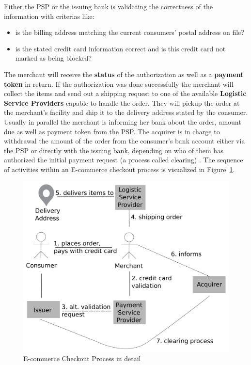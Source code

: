 Either the \gls{PSP} or the issuing bank is validating the correctness of the information with criterias like: \@

\begin{itemize}
    \item is the billing address matching the current consumers' postal address on file?
    \item is the stated credit card information correct and is this credit card not marked as being blocked?
\end{itemize}

The merchant will receive the \textbf{status} of the authorization as well as a \textbf{payment token} in return. If the authorization was done successfully the merchant will collect the items and send out a shipping request to one of the available \textbf{Logistic Service Providers} capable to handle the order. They will pickup the order at the merchant's facility and ship it to the delivery address stated by the consumer. Usually in parallel the merchant is informing her bank about the order, amount due as well as payment token from the \gls{PSP}. The acquirer is in charge to withdrawal the amount of the order from the consumer's bank account either via the \gls{PSP} or directly with the issuing bank, depending on who of them has authorized the initial payment request (a process called clearing) \citep{VisaPayment2014}. The sequence of activities within an E-commerce checkout process is visualized in Figure~\ref{fig:images_ecommerce_checkout_process}.\@

\begin{figure}[H]
	\centering
		\includegraphics[width=0.8\columnwidth]{images/e-commerce-checkout-process.pdf}
	\caption{E-commerce Checkout Process in detail}
\label{fig:images_ecommerce_checkout_process}
\end{figure}

